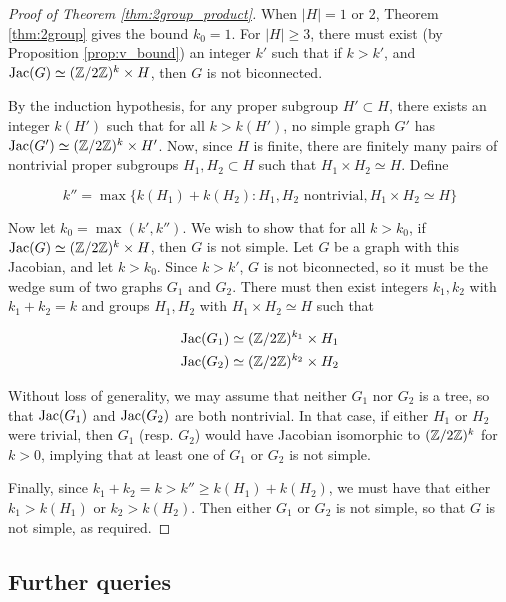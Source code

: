 \documentclass{amsart}
\begin{document}
\begin{proof}[Proof of Theorem \ref{thm:2group_product}]
When $|H| = 1$ or $2$, Theorem \ref{thm:2group} gives the
bound $k_0 = 1$. For $|H| \ge 3$, there must exist (by Proposition
\ref{prop:v_bound}) an integer $k'$ such that if $k > k'$, and
$\operatorname{Jac}(G) \simeq (\mathbb{Z}/2\mathbb{Z})^k \times H$, then $G$ is not biconnected.

By the induction hypothesis, for any proper subgroup $H' \subset H$,
there exists an integer $k(H')$ such that for all $k > k(H')$, no
simple graph $G'$ has $\operatorname{Jac}(G') \simeq (\mathbb{Z}/2\mathbb{Z})^k \times H'$. Now,
since $H$ is finite, there are finitely many pairs of nontrivial
proper subgroups $H_1, H_2 \subset H$ such that $H_1 \times H_2 \simeq
H$. Define

\begin{equation*}
  k'' = \max\{k(H_1) + k(H_2) : H_1, H_2 \textrm{ nontrivial}, H_1
  \times H_2 \simeq H\}
\end{equation*}

Now let $k_0 = \max(k', k'')$. We wish to show that for all $k > k_0$,
if $\operatorname{Jac}(G) \simeq (\mathbb{Z}/2\mathbb{Z})^k \times H$, then $G$ is not simple. Let
$G$ be a graph with this Jacobian, and let $k > k_0$.  Since $k > k'$,
$G$ is not biconnected, so it must be the wedge sum of two graphs
$G_1$ and $G_2$. There must then exist integers $k_1, k_2$ with $k_1 +
k_2 = k$ and groups $H_1, H_2$ with $H_1 \times H_2 \simeq H$ such
that

\begin{align}
  \operatorname{Jac}(G_1) &\simeq (\mathbb{Z}/2\mathbb{Z})^{k_1} \times H_1 \\
  \operatorname{Jac}(G_2) &\simeq (\mathbb{Z}/2\mathbb{Z})^{k_2} \times H_2
\end{align}

Without loss of generality, we may assume that neither $G_1$ nor $G_2$
is a tree, so that $\operatorname{Jac}(G_1)$ and $\operatorname{Jac}(G_2)$ are both nontrivial. In
that case, if either $H_1$ or $H_2$ were trivial, then $G_1$
(resp. $G_2$) would have Jacobian isomorphic to $(\mathbb{Z}/2\mathbb{Z})^k$ for $k >
0$, implying that at least one of $G_1$ or $G_2$ is not simple.

Finally, since $k_1 + k_2 = k > k'' \ge k(H_1) + k(H_2)$, we must have
that either $k_1 > k(H_1)$ or $k_2 > k(H_2)$. Then either $G_1$ or
$G_2$ is not simple, so that $G$ is not simple, as required.
\end{proof}

\subsection{Further queries} 
\end{document}
